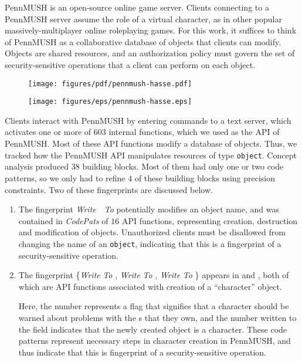 PennMUSH is an open-source online game server. Clients connecting to a PennMUSH
server assume the role of a virtual character, as in other popular
massively-multiplayer online roleplaying games. For this work, it suffices to
think of PennMUSH as a collaborative database of objects that clients can
modify. Objects are shared resources, and an authorization policy must govern
the set of security-sensitive operations that a client can perform on each
object.

\begin{figure}[ht!]
\begin{center}
\ifpdf
\centerline{\texttt{[image: figures/pdf/pennmush-hasse.pdf]}}
\else
\centerline{\texttt{[image: figures/eps/pennmush-hasse.eps]}}
\fi
\end{center} 
\end{figure}

Clients interact with PennMUSH by entering commands to a text server, which
activates one or more of $603$ internal functions, which we used as the API of
PennMUSH. Most of these API functions modify a database of objects. Thus, we
tracked how the PennMUSH API manipulates resources of type \texttt{object}.
Concept analysis produced $38$ building blocks. Most of them had only
one or two code patterns, so we only had to refine $4$ of these building
blocks using precision constraints.  Two of these fingerprints are
discussed below.


\begin{enumerate}
%
\item The fingerprint \textit{Write}~\unk\ \textit{To} 
potentially modifies an object name, and was contained in \textit{CodePats} of
$16$ API functions, representing creation, destruction and modification of
objects. Unauthorized clients must be disallowed from changing the name of an
\texttt{object}, indicating that this is a fingerprint of a security-sensitive
operation. 
%
\item The fingerprint \{\textit{Write}  \textit{To}
, \textit{Write}  \textit{To}
, \textit{Write}  \textit{To}
\} appears in  and
, both of which are API functions associated with
creation of a ``character'' object. 

Here, the number  represents a flag that signifies that a
character should be warned about problems with the s that they
own, and the number  written to the field  indicates that
the newly created object is a character.  These code patterns represent
necessary steps in character creation in PennMUSH, and thus indicate that this
is fingerprint of a security-sensitive operation.

\end{enumerate}

